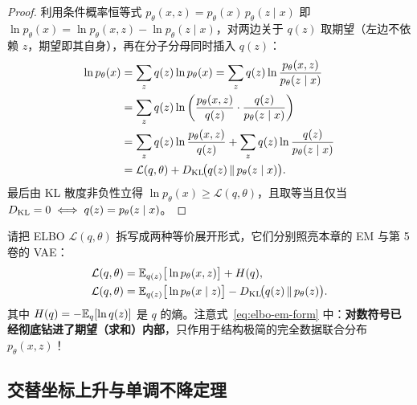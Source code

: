 \begin{proof}
利用条件概率恒等式 $p_\theta(x, z) = p_\theta(x)\, p_\theta(z \mid x)$ 即 $\ln p_\theta(x) = \ln p_\theta(x, z) - \ln p_\theta(z \mid x)$，对两边关于 $q(z)$ 取期望（左边不依赖 $z$，期望即其自身），再在分子分母同时插入 $q(z)$：
\begin{align*}
  \ln p_\theta(x)
  &= \sum_{z} q(z) \ln p_\theta(x)
   = \sum_{z} q(z) \ln \frac{p_\theta(x, z)}{p_\theta(z \mid x)} \\
  &= \sum_{z} q(z) \ln \left(\frac{p_\theta(x, z)}{q(z)} \cdot \frac{q(z)}{p_\theta(z \mid x)}\right) \\
  &= \sum_{z} q(z) \ln \frac{p_\theta(x, z)}{q(z)} + \sum_{z} q(z) \ln \frac{q(z)}{p_\theta(z \mid x)} \\
  &= \mathcal{L}(q, \theta) + D_{\mathrm{KL}}\!\big(q(z) \,\|\, p_\theta(z \mid x)\big).
\end{align*}
最后由 KL 散度非负性立得 $\ln p_\theta(x) \ge \mathcal{L}(q, \theta)$，且取等当且仅当 $D_{\mathrm{KL}} = 0 \iff q(z) = p_\theta(z \mid x)$。
\end{proof}

请把 ELBO $\mathcal{L}(q, \theta)$ 拆写成两种等价展开形式，它们分别照亮本章的 EM 与第 5 卷的 VAE：
\begin{align}
  \mathcal{L}(q, \theta) &= \mathbb{E}_{q(z)}\big[\ln p_\theta(x, z)\big] + H(q), \label{eq:elbo-em-form}\\
  \mathcal{L}(q, \theta) &= \mathbb{E}_{q(z)}\big[\ln p_\theta(x \mid z)\big] - D_{\mathrm{KL}}\!\big(q(z) \,\|\, p_\theta(z)\big). \label{eq:elbo-vae-form}
\end{align}
其中 $H(q) = -\mathbb{E}_q[\ln q(z)]$ 是 $q$ 的熵。注意式~\eqref{eq:elbo-em-form} 中：\textbf{对数符号已经彻底钻进了期望（求和）内部}，只作用于结构极简的完全数据联合分布 $p_\theta(x, z)$！

\subsection{交替坐标上升与单调不降定理}

